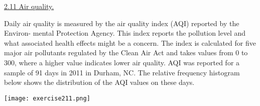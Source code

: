 \documentclass[10pt,letterpaper,unboxed,cm]{exam}
\begin{document}
\begin{questions}



	\question \underline{2.11 Air quality.}

    Daily air quality is measured by the air quality index (AQI) reported by the Environ- mental Protection Agency. This index reports the pollution level and what associated health effects might be a concern. The index is calculated for five major air pollutants regulated by the Clean Air Act and takes values from 0 to 300, where a higher value indicates lower air quality. AQI was reported for a sample of 91 days in 2011 in Durham, NC. The relative frequency histogram below shows the distribution of the AQI values on these days.

    \texttt{[image: exercise211.png]}
    
\end{questions}
\end{document}
